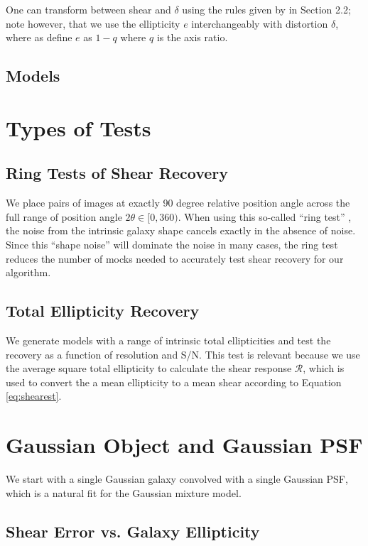 \documentclass[10pt,preprint]{aastex}
\newcommand{\psf}{PSF}
\newcommand{\Rshear}{\ensuremath{\mathcal{R}}}
\begin{document}
One can transform between shear and $\delta$ using the rules given by
\citet{bern02} in Section 2.2; note however, that we use the ellipticity 
$e$ interchangeably with distortion $\delta$, where as \citet{bern02} define
$e$ as $1-q$ where $q$ is the axis ratio.

\subsection{Models}

\section{Types of Tests}

\subsection{Ring Tests of Shear Recovery}

We place pairs of images at exactly 90 degree relative position angle across
the full range of position angle $2 \theta \in [0,360)$.  When using this
so-called ``ring test'' \citep{Nakajima2007}, the noise from the intrinsic
galaxy shape cancels exactly in the absence of noise.  Since this ``shape
noise'' will dominate the noise in many cases, the ring test reduces the number
of mocks needed to accurately test shear recovery for our algorithm.

\subsection{Total Ellipticity Recovery}

We generate models with a range of intrinsic total ellipticities and test the
recovery as a function of resolution and S/N.  This test is relevant because we
use the average square total ellipticity to calculate the shear response
\Rshear, which is used to convert the a mean ellipticity to a
mean shear according to Equation \ref{eq:shearest}.

\section{Gaussian Object and Gaussian \psf}

We start with a single Gaussian galaxy convolved with a single Gaussian \psf,
which is a natural fit for the Gaussian mixture model.  

\subsection{Shear Error vs. Galaxy Ellipticity}
\end{document}
